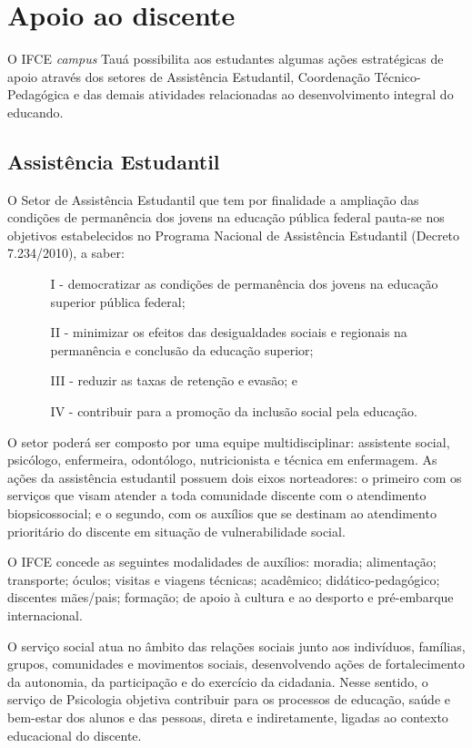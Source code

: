 \documentclass[
	12pt,				%
	openright,			%
	twoside,			%
	a4paper,			%
	chapter=TITLE,		%
	english,			%
	french,				%
	spanish,			%
	brazil,				%
	]{abntex2}
\begin{document}
\chapter{Apoio ao discente}
O IFCE \textit{campus} Tauá possibilita aos estudantes algumas ações estratégicas de apoio através dos setores de Assistência Estudantil, Coordenação Técnico-Pedagógica e das demais atividades relacionadas ao desenvolvimento integral do educando.


\section{Assistência Estudantil}
O  Setor de Assistência Estudantil que tem por finalidade a ampliação das condições de permanência dos jovens na educação pública federal pauta-se nos objetivos estabelecidos no Programa Nacional de Assistência Estudantil (Decreto 7.234/2010), a saber:
\begin{itemize}
\item[]
\begin{itemize}
    \setlength\itemsep{0em}
    \item[I -] democratizar as condições de permanência dos jovens na educação superior pública federal;
    \item[II -] minimizar os efeitos das desigualdades sociais e regionais na permanência e conclusão da educação superior;
    \item[III -] reduzir as taxas de retenção e evasão; e
    \item[IV -] contribuir para a promoção da inclusão social pela educação.
\end{itemize}
\end{itemize}

O setor poderá ser composto por uma equipe multidisciplinar: assistente social, psicólogo,
enfermeira, odontólogo, nutricionista e técnica em enfermagem. As ações da assistência estudantil possuem dois eixos norteadores: o primeiro com os serviços que visam atender a toda comunidade discente com o atendimento biopsicossocial; e o segundo, com os auxílios que se destinam ao atendimento prioritário do discente em situação de vulnerabilidade social.


O IFCE concede as seguintes modalidades de auxílios: moradia; alimentação; transporte; óculos; visitas e viagens técnicas; acadêmico; didático-pedagógico; discentes mães/pais; formação; de apoio à cultura e ao desporto e pré-embarque internacional.

O serviço social atua no âmbito das relações sociais junto aos indivíduos, famílias, grupos, comunidades e movimentos sociais, desenvolvendo ações de fortalecimento da autonomia, da participação e do exercício da cidadania. Nesse sentido, o serviço de Psicologia objetiva contribuir para os processos de educação, saúde e bem-estar dos alunos e das pessoas, direta e indiretamente, ligadas ao contexto educacional do discente.
\end{document}
